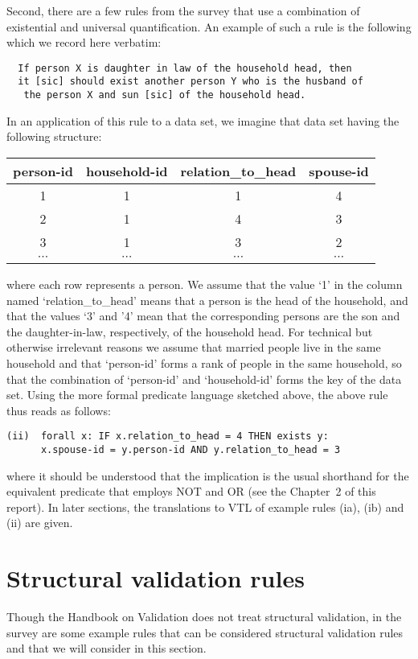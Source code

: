 Second, there are a few rules from the survey that use a combination of existential and universal quantification. An example of such a rule is the following which we record here verbatim:
\begin{verbatim}
  If person X is daughter in law of the household head, then
  it [sic] should exist another person Y who is the husband of
   the person X and sun [sic] of the household head.
\end{verbatim}
In an application of this rule to a data set, we imagine that data set having the following structure:
\begin{center}
\begin{tabular}[c]{|c|c|c|c|}
\hline
person-id & household-id & relation\_to\_head & spouse-id \\
\hline
\hline
1 & 1 & 1 & 4\\
\hline
2 & 1 & 4 & 3\\
\hline
3 & 1 & 3 & 2\\
\hline
$\cdots$ & $\cdots$ & $\cdots$ & $\cdots$\\
\hline
\end{tabular}
\end{center}
where each row represents a person. We assume that the value `1' in the column named `relation\_to\_head' means that a person is the head of the household, and that the values `3' and '4' mean that the corresponding persons are the son and the daughter-in-law, respectively, of the household head. For technical but otherwise irrelevant reasons we assume that married people live in the same household and that `person-id' forms a rank of people in the same household, so that the combination of `person-id' and `household-id' forms the key of the data set. Using the more formal predicate language sketched above, the above rule thus reads as follows:
\begin{verbatim}
(ii)  forall x: IF x.relation_to_head = 4 THEN exists y:
      x.spouse-id = y.person-id AND y.relation_to_head = 3
\end{verbatim}
where it should be understood that the implication is the usual shorthand for the equivalent predicate that employs NOT and OR (see the Chapter~2 of this report). In later sections, the translations to VTL of example rules (ia), (ib) and (ii) are given.

\section{Structural validation rules}
Though the Handbook on Validation \cite{validation_handbook} does not treat structural validation, in the survey are some example rules that can be considered structural validation rules and that we will consider in this section.

